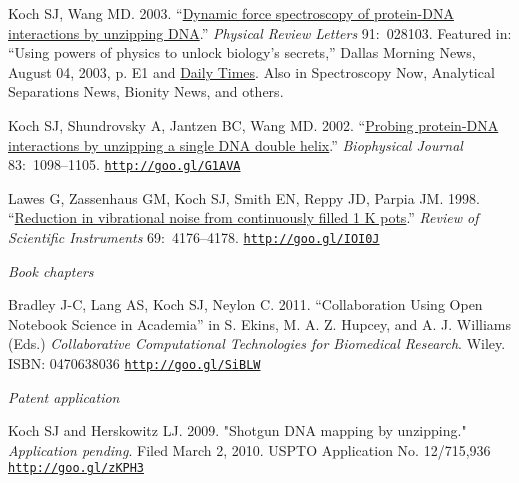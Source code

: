 \documentclass[11pt]{article}
\begin{document}
\ind Koch SJ, Wang MD. 2003. ``\href{http://goo.gl/XanG0}{Dynamic force spectroscopy of protein-DNA interactions by unzipping DNA}.'' \emph{Physical Review Letters} 91:~028103.  Featured in: “Using powers of physics to unlock biology's secrets,” Dallas Morning News, August 04, 2003, p. E1 and \href{http://goo.gl/2m7LF}{Daily Times}. Also in Spectroscopy Now, Analytical Separations News, Bionity News, and others.


\ind Koch SJ, Shundrovsky A, Jantzen BC, Wang MD. 2002.  ``\href{http://goo.gl/G1AVA}{Probing protein-DNA interactions by unzipping a single DNA double helix}.'' \emph{Biophysical Journal} 83:~1098–1105. {\scriptsize  \texttt{\href{http://goo.gl/G1AVA}{http://goo.gl/G1AVA}}}


\ind Lawes G, Zassenhaus GM, Koch SJ, Smith EN, Reppy JD, Parpia JM. 1998. ``\href{http://goo.gl/IOI0J}{Reduction in vibrational noise from continuously filled 1 K pots}.''  \emph{Review of Scientific Instruments}
69:~4176–4178. {\scriptsize  \texttt{\href{http://goo.gl/IOI0J}{http://goo.gl/IOI0J}}}



\bigskip

\noindent\emph{Book chapters \vspace{0.05in}}

\ind Bradley J-C, Lang AS, Koch SJ, Neylon C. 2011. ``Collaboration Using Open Notebook Science in Academia'' in S. Ekins, M. A. Z. Hupcey, and A. J. Williams (Eds.) \emph{Collaborative Computational Technologies for Biomedical Research}. Wiley. ISBN: 0470638036 {\scriptsize  \texttt{\href{http://goo.gl/SiBLW}{http://goo.gl/SiBLW}}}


\bigskip 
 
\noindent\emph{Patent application \vspace{0.05in}}

\ind Koch SJ and Herskowitz LJ. 2009. "Shotgun DNA mapping by unzipping." \emph{Application pending}. Filed March 2, 2010. USPTO  Application No. 12/715,936 {\scriptsize  \texttt{\href{http://goo.gl/zKPH3}{http://goo.gl/zKPH3}}}
\end{document}
